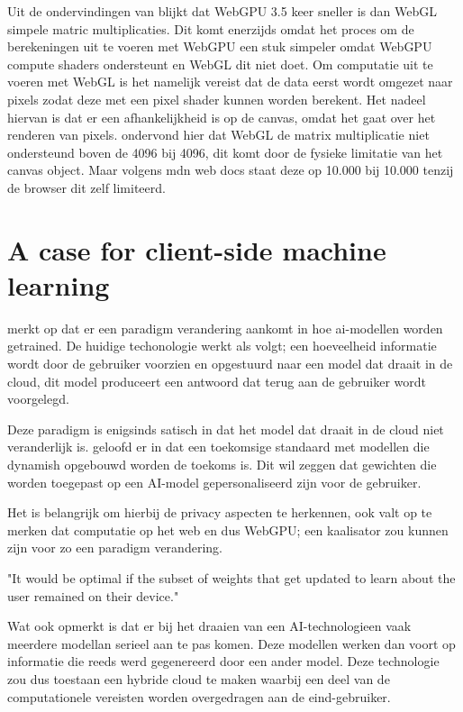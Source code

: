 Uit de ondervindingen van \textcite{Radin2021} blijkt dat WebGPU 3.5 keer sneller is dan WebGL simpele matric multiplicaties. Dit komt enerzijds omdat het proces om de berekeningen uit te voeren met WebGPU een stuk simpeler omdat WebGPU compute shaders ondersteunt en WebGL dit niet doet. Om computatie uit te voeren met WebGL is het namelijk vereist dat de data eerst wordt omgezet naar pixels zodat deze met een pixel shader kunnen worden berekent. Het nadeel hiervan is dat er een afhankelijkheid is op de canvas, omdat het gaat over het renderen van pixels. \textcite{Radin2021} ondervond hier dat WebGL de matrix multiplicatie niet ondersteund boven de 4096 bij 4096, dit komt door de fysieke limitatie van het canvas object. Maar volgens mdn web docs staat deze op 10.000 bij 10.000 tenzij de browser dit zelf limiteerd.

\break{}

\section{A case for client-side machine learning} %

\textcite{Fleetwood2022} merkt op dat er een paradigm verandering aankomt in hoe ai-modellen worden getrained. De huidige techonologie werkt als volgt; een hoeveelheid informatie wordt door de gebruiker voorzien en opgestuurd naar een model dat draait in de cloud, dit model produceert een antwoord dat terug aan de gebruiker wordt voorgelegd.

\bigbreak{}

Deze paradigm is enigsinds satisch in dat het model dat draait in de cloud niet veranderlijk is. \textcite{Fleetwood2022} geloofd er in dat een toekomsige standaard met modellen die dynamish opgebouwd worden de toekoms is. Dit wil zeggen dat gewichten die worden toegepast op een AI-model gepersonaliseerd zijn voor de gebruiker.

\bigbreak{}

Het is belangrijk om hierbij de privacy aspecten te herkennen, ook valt op te merken dat computatie op het web en dus WebGPU; een kaalisator zou kunnen zijn voor zo een paradigm verandering.

\begin{displayquote}
    "It would be optimal if the subset of weights that get updated to learn about the user remained on their device." \autocite{Fleetwood2022}
\end{displayquote}

Wat \textcite{Fleetwood2022} ook opmerkt is dat er bij het draaien van een AI-technologieen vaak meerdere modellan serieel aan te pas komen. Deze modellen werken dan voort op informatie die reeds werd gegenereerd door een ander model. Deze technologie zou dus toestaan een hybride cloud te maken waarbij een deel van de computationele vereisten worden overgedragen aan de eind-gebruiker.


